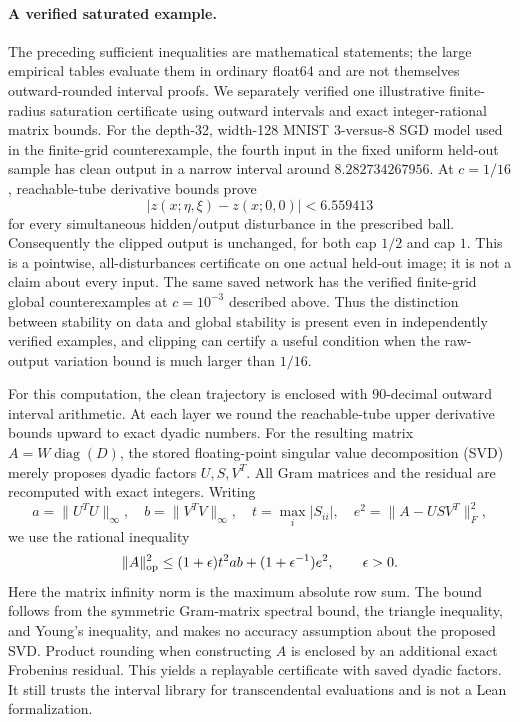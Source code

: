 \paragraph{A verified saturated example.}
The preceding sufficient inequalities are mathematical statements; the large empirical tables evaluate them in ordinary float64 and are not themselves outward-rounded interval proofs.  We separately verified one illustrative finite-radius saturation certificate using outward intervals and exact integer-rational matrix bounds.  For the depth-32, width-128 MNIST 3-versus-8 SGD model used in the finite-grid counterexample, the fourth input in the fixed uniform held-out sample has clean output in a narrow interval around $8.282734267956$.  At $c=1/16$, reachable-tube derivative bounds prove
\[
 |z(x;\eta,\xi)-z(x;0,0)|<6.559413
\]
for every simultaneous hidden/output disturbance in the prescribed ball.  Consequently the clipped output is unchanged, for both cap $1/2$ and cap $1$.  This is a pointwise, all-disturbances certificate on one actual held-out image; it is not a claim about every input.  The same saved network has the verified finite-grid global counterexamples at $c=10^{-3}$ described above.  Thus the distinction between stability on data and global stability is present even in independently verified examples, and clipping can certify a useful condition when the raw-output variation bound is much larger than $1/16$.

For this computation, the clean trajectory is enclosed with 90-decimal outward interval arithmetic.  At each layer we round the reachable-tube upper derivative bounds upward to exact dyadic numbers.  For the resulting matrix $A=W\operatorname{diag}(D)$, the stored floating-point singular value decomposition (SVD) merely proposes dyadic factors $U,S,V^T$.  All Gram matrices and the residual are recomputed with exact integers.  Writing
\[
 a=\|U^TU\|_\infty,\quad b=\|V^TV\|_\infty,
 \quad t=\max_i|S_{ii}|,\quad e^2=\|A-USV^T\|_F^2,
\]
we use the rational inequality
\[
 \|A\|_{\rm op}^2
 \le (1+\epsilon)t^2ab+(1+\epsilon^{-1})e^2,
 \qquad \epsilon>0.
\]
Here the matrix infinity norm is the maximum absolute row sum.  The bound follows from the symmetric Gram-matrix spectral bound, the triangle inequality, and Young's inequality, and makes no accuracy assumption about the proposed SVD.  Product rounding when constructing $A$ is enclosed by an additional exact Frobenius residual.  This yields a replayable certificate with saved dyadic factors.  It still trusts the interval library for transcendental evaluations and is not a Lean formalization.

